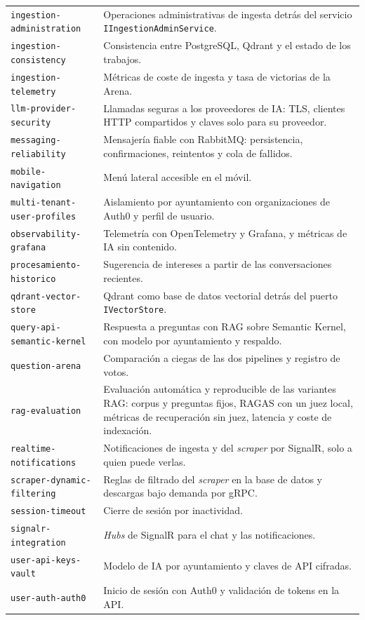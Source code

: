 {\begin{longtable}{@{}p{} p{}@{}}
\texttt{ingestion-administration} & Operaciones administrativas de ingesta detrás del servicio \texttt{IIngestionAdminService}. \\
\texttt{ingestion-consistency} & Consistencia entre PostgreSQL, Qdrant y el estado de los trabajos. \\
\texttt{ingestion-telemetry} & Métricas de coste de ingesta y tasa de victorias de la Arena. \\
\texttt{llm-provider-security} & Llamadas seguras a los proveedores de IA: TLS, clientes HTTP compartidos y claves solo para su proveedor. \\
\texttt{messaging-reliability} & Mensajería fiable con RabbitMQ: persistencia, confirmaciones, reintentos y cola de fallidos. \\
\texttt{mobile-navigation} & Menú lateral accesible en el móvil. \\
\texttt{multi-tenant-user-profiles} & Aislamiento por ayuntamiento con organizaciones de Auth0 y perfil de usuario. \\
\texttt{observability-grafana} & Telemetría con OpenTelemetry y Grafana, y métricas de IA sin contenido. \\
\texttt{procesamiento-historico} & Sugerencia de intereses a partir de las conversaciones recientes. \\
\texttt{qdrant-vector-store} & Qdrant como base de datos vectorial detrás del puerto \texttt{IVectorStore}. \\
\texttt{query-api-semantic-kernel} & Respuesta a preguntas con RAG sobre Semantic Kernel, con modelo por ayuntamiento y respaldo. \\
\texttt{question-arena} & Comparación a ciegas de las dos pipelines y registro de votos. \\
\texttt{rag-evaluation} & Evaluación automática y reproducible de las variantes RAG: corpus y preguntas fijos, RAGAS con un juez local, métricas de recuperación sin juez, latencia y coste de indexación. \\
\texttt{realtime-notifications} & Notificaciones de ingesta y del \emph{scraper} por SignalR, solo a quien puede verlas. \\
\texttt{scraper-dynamic-filtering} & Reglas de filtrado del \emph{scraper} en la base de datos y descargas bajo demanda por gRPC. \\
\texttt{session-timeout} & Cierre de sesión por inactividad. \\
\texttt{signalr-integration} & \emph{Hubs} de SignalR para el chat y las notificaciones. \\
\texttt{user-api-keys-vault} & Modelo de IA por ayuntamiento y claves de API cifradas. \\
\texttt{user-auth-auth0} & Inicio de sesión con Auth0 y validación de tokens en la API. \\
\bottomrule
\end{longtable}
}

